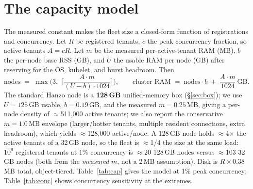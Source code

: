 \documentclass[11pt]{article}
\begin{document}
\section{The capacity model}
\label{sec:capacity}
The measured constant makes the fleet size a closed-form function of registrations and
concurrency. Let $R$ be registered tenants, $c$ the peak concurrency fraction, so active
tenants $A = cR$. Let $m$ be the measured per-active-tenant RAM (MB), $b$ the per-node base RSS
(GB), and $U$ the usable RAM per node (GB) after reserving for the OS, kubelet, and burst
headroom. Then
\begin{equation}
\text{nodes} \;=\; \max\!\Big(3,\; \Big\lceil \frac{A \cdot m}{(U - b)\cdot 1024} \Big\rceil\Big),
\qquad
\text{cluster RAM} \;=\; \text{nodes}\cdot b \;+\; \frac{A\cdot m}{1024}\ \text{GB}.
\label{eq:model}
\end{equation}
The standard Hanzo node is a \textbf{128\,GB} unified-memory box (\S\ref{sec:box}); we use
$U = 125$\,GB usable, $b = 0.19$\,GB, and the measured $m = 0.25$\,MB, giving a per-node density
of $\approx$511{,}000 active tenants; we also report the conservative $m = 1.0$\,MB envelope
(larger/hotter tenants, multiple resident connections, extra headroom), which yields
$\approx$128{,}000 active/node. A 128\,GB node holds $\approx$4$\times$ the active tenants of a
32\,GB node, so the fleet is $\approx$1/4 the size at the same load: $10^9$ registered tenants
at 1\% concurrency is $\approx$20 128\,GB nodes versus $\approx$103 32\,GB nodes (both from the
\emph{measured} $m$, not a 2\,MB assumption). Disk is $R \times 0.38$\,MB total, object-tiered.
Table~\ref{tab:cap} gives the model at 1\% peak concurrency; Table~\ref{tab:conc} shows
concurrency sensitivity at the extremes.
\end{document}

